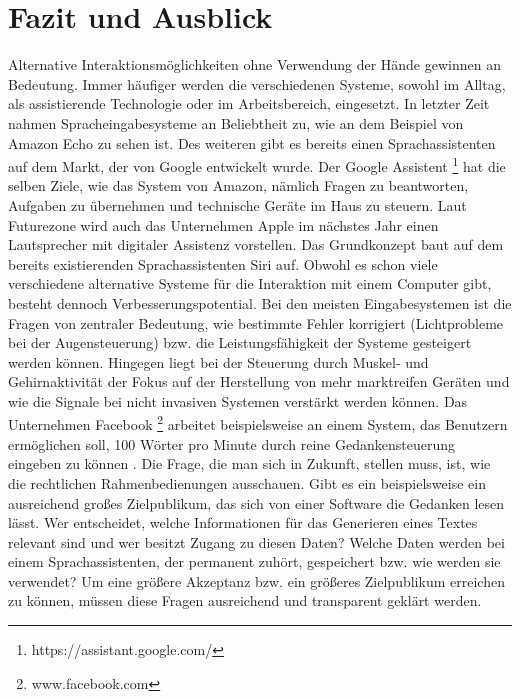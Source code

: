 \chapter{Fazit und Ausblick}

Alternative Interaktionsmöglichkeiten ohne Verwendung der Hände gewinnen an Bedeutung. Immer häufiger werden die verschiedenen Systeme, sowohl im Alltag, als assistierende Technologie oder im Arbeitsbereich, eingesetzt.
\newline \newline
In letzter Zeit nahmen Spracheingabesysteme an Beliebtheit zu, wie an dem Beispiel von Amazon Echo zu sehen ist. Des weiteren gibt es bereits einen Sprachassistenten auf dem Markt, der von Google entwickelt wurde. Der Google Assistent%
\footnote{https://assistant.google.com/}
%
hat die selben Ziele, wie das System von Amazon, nämlich Fragen zu beantworten, Aufgaben zu übernehmen und technische Geräte im Haus zu steuern. Laut Futurezone \cite{Futurezone} wird auch das Unternehmen Apple im nächstes Jahr einen Lautsprecher mit digitaler Assistenz vorstellen. Das Grundkonzept baut auf dem bereits existierenden Sprachassistenten Siri auf.
\newline \newline
Obwohl es schon viele verschiedene alternative Systeme für die Interaktion mit einem Computer gibt, besteht dennoch Verbesserungspotential. Bei den meisten Eingabesystemen ist die Fragen von zentraler Bedeutung, wie bestimmte Fehler korrigiert (\zB Lichtprobleme bei der Augensteuerung) bzw. die Leistungsfähigkeit der Systeme gesteigert werden können. Hingegen liegt bei der Steuerung durch Muskel- und Gehirnaktivität der Fokus auf der Herstellung von mehr marktreifen Geräten und wie die Signale bei nicht invasiven Systemen verstärkt werden können. Das Unternehmen Facebook%
\footnote{www.facebook.com}
%
arbeitet beispielsweise an einem System, das Benutzern ermöglichen soll, 100 Wörter pro Minute durch reine Gedankensteuerung eingeben zu können \cite{Facebook}.
\newline \newline
Die Frage, die man sich in Zukunft, stellen muss, ist, wie die rechtlichen Rahmenbedienungen ausschauen. Gibt es ein beispielsweise ein ausreichend großes Zielpublikum, das sich von einer Software die Gedanken lesen lässt. Wer entscheidet, welche Informationen für das Generieren eines Textes relevant sind und wer besitzt Zugang zu diesen Daten? Welche Daten werden bei einem Sprachassistenten, der permanent zuhört, gespeichert bzw. wie werden sie verwendet? Um eine größere Akzeptanz bzw. ein größeres Zielpublikum erreichen zu können, müssen diese Fragen ausreichend und transparent geklärt werden.
